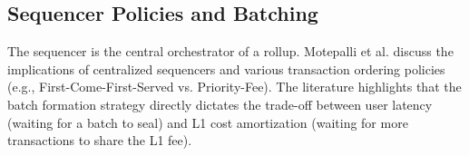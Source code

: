 \subsection{Sequencer Policies and Batching}
The sequencer is the central orchestrator of a rollup. Motepalli et al. \citet{motepalli2023sequencers} discuss the implications of centralized sequencers and various transaction ordering policies (e.g., First-Come-First-Served vs. Priority-Fee). The literature highlights that the batch formation strategy directly dictates the trade-off between user latency (waiting for a batch to seal) and L1 cost amortization (waiting for more transactions to share the L1 fee).